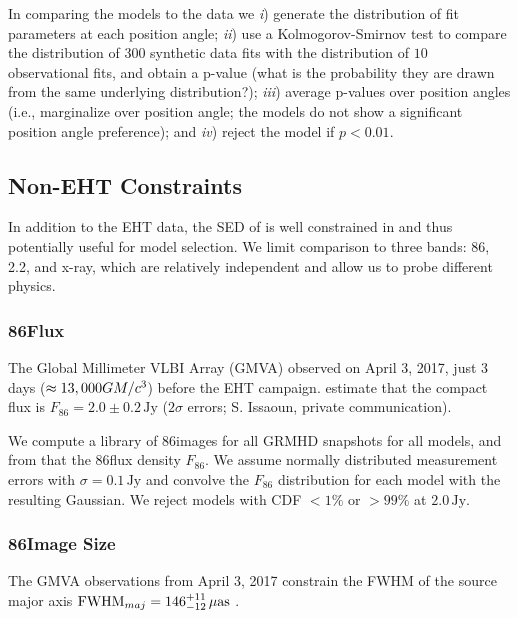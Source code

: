 In comparing the models to the data we
\emph{i}) generate the distribution of fit parameters at each position angle;
\emph{ii}) use a Kolmogorov-Smirnov test to compare the distribution of $300$ synthetic data fits with the distribution of $10$ observational fits, and obtain a p-value (what is the probability they are drawn from the same underlying distribution?);
\emph{iii}) average p-values over position angles (i.e., marginalize over position angle; the models do not show a significant position angle preference); and
\emph{iv}) reject the model if $p < 0.01$.

\subsection{Non-EHT Constraints}

In addition to the EHT data, the SED of \sgra is well constrained in  and thus potentially useful for model selection.
We limit comparison to three bands: 86\GHz, 2.2\um, and x-ray, which are relatively independent and allow us to probe different physics.

\subsubsection{86\GHz Flux}

The Global Millimeter VLBI Array (GMVA) observed \sgra on April 3, 2017, just 3 days ($\approx 13,000 GM/c^3$) before the EHT campaign.
\citet{2019ApJ...871...30I} estimate that the compact flux is $F_{86} = 2.0 \pm 0.2\,\mathrm{Jy}$ ($2\sigma$ errors; S. Issaoun, private communication).

We compute a library of 86\GHz images for all GRMHD snapshots for all models, and from that the 86\GHz flux density $F_{86}$.  We assume normally distributed measurement errors with $\sigma = 0.1\,\mathrm{Jy}$ and convolve the $F_{86}$ distribution for each model with the resulting Gaussian.  We reject models with CDF $< 1\%$ or $> 99\%$ at $2.0\,\mathrm{Jy}$.

\subsubsection{86\GHz Image Size}

The GMVA observations from April 3, 2017 constrain the FWHM of the source major axis ${\rm FWHM}_{maj} = 146^{+11}_{-12}\,\mathrm{\mu as}$ \citep[95\% confidence][]{2021ApJ...915...99I}.

